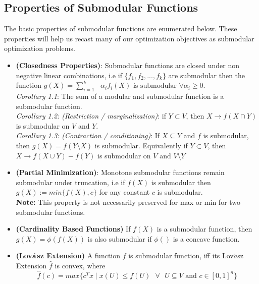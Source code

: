 \subsection{Properties of Submodular Functions}
The basic properties of submodular functions are enumerated below. These properties will help us recast many of our optimization objectives as submodular optimization problems.\\

\begin{itemize}
 \item {\bf \lemma (Closedness Properties)}: Submodular functions are closed under non negative linear combinations, i.e if $\{f_1,f_2,...,f_k\}$ are submodular then the function $g(X) = \sum\limits_{i=1}^k\text{ } \alpha_if_i(X) \text{ is submodular }\forall \alpha_i \geq 0$.\\
 
 {\it Corollary 1.1}: The sum of a modular and submodular function is a submodular function.\\
 
 {\it Corollary 1.2: (Restriction / marginalization)}: if $Y\subset V$, then $X\rightarrow f(X \cap Y)$ is submodular on $V$ and $Y$.\\
 
 {\it Corollary 1.3: (Contraction / conditioning)}: If $X \subseteq Y$ and $f$ is submodular, then $g(X) = f(Y\setminus X)$ is submodular. Equivalently if $Y\subset V$, then $X\rightarrow f(X \cup Y) - f(Y)$ is submodular on $V$ and $V\setminus Y$\\
 
 \item {\bf \lemma (Partial Minimization)}: Monotone submodular functions remain submodular under truncation, i.e if $f(X)$ is submodular then $g(X) := min\{f(X),c\}$ for any constant $c$ is submodular.\\
 
 {\bf Note:} This property is not necessarily preserved for max or min for two submodular functions.\\
 
 \item{\bf \lemma (Cardinality Based Functions)} If $f(X)$ is a submodular function, then $g(X) = \phi(f(X))$ is also submodular if $\phi()$ is a concave function.\\
 
 \item{\bf \lemma (Lov$\acute{\bf a}$sz Extension)} A function $f$ is submodular function, iff its Lov$\acute{a}$sz Extension $\hat{f}$ is convex, where
 \[
  \hat{f}(c) = max\{c^Tx \mid x(U) \leq f(U) \text{ } \forall \text{ } U \subseteq V \text{ and } c\in[0,1]^n\}
 \]

\end{itemize}